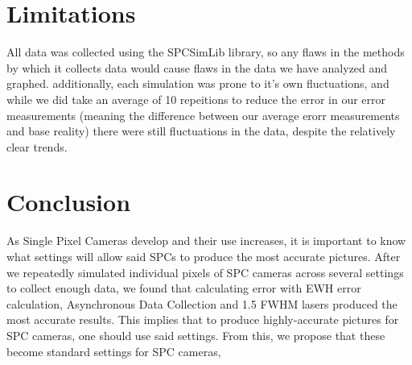 \documentclass{article}
\begin{document}
\section*{Limitations}
All data was collected using the SPCSimLib library, so any flaws in the methods by which it collects data would cause flaws in the data we have analyzed and graphed. additionally, each simulation was prone to it's own fluctuations, and while we did take an average of 10 repeitions to reduce the error in our error measurements (meaning the difference between our average erorr measurements and base reality) there were still fluctuations in the data, despite the relatively clear trends.

\section*{Conclusion}
As Single Pixel Cameras develop and their use increases, it is important to know what settings will allow said SPCs to produce the most accurate pictures. After we repeatedly simulated  individual pixels of SPC cameras across several settings to collect enough data, we found that calculating error with EWH error calculation, Asynchronous Data Collection and 1.5 FWHM lasers produced the most accurate results. This implies that to produce highly-accurate pictures for SPC cameras, one should use said settings. From this, we propose that these become standard settings for SPC cameras,

\printbibliography
\end{document}
